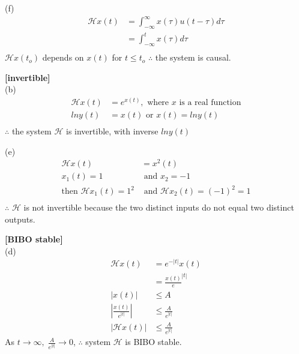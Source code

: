 \documentclass{article}
\begin{document}
(f)
\begin{equation*}
\begin{split}
    \mathcal{H}x(t) &= \int_{-\infty}^{\infty} x(\tau) u (t - \tau) d\tau\\
    &= \int_{-\infty}^{t} x(\tau) d\tau\\
\end{split}
\end{equation*}
$\mathcal{H}x(t_o)$ depends on $x(t)$ for $t \leq t_o$ $\therefore$ the system is causal.


 {\bf [invertible]}\\
(b)
\begin{equation*}
\begin{split}
    \mathcal{H}x(t) &= e^{x(t)}, \text{ where $x$ is a real function}\\
    ln y(t) &= x(t) \text{ or } x(t) = ln y(t)\\
\end{split}
\end{equation*}
$\therefore$ the system $\mathcal{H}$ is invertible, with inverse $lny(t)$

(e)
\begin{equation*}
\begin{split}
    \mathcal{H}x(t) &= x^2(t)\\
    x_1(t) = 1 &\text{ and } x_2 = -1\\
    \text{then } \mathcal{H}x_1(t) = 1^2 &\text{ and } \mathcal{H}x_2(t) = (-1)^2 = 1\\
\end{split}
\end{equation*}
$\therefore$ $\mathcal{H}$ is not invertible because the two distinct inputs do not equal two distinct outputs.


 {\bf [BIBO stable]}\\
(d)
\begin{equation*}
\begin{split}
    \mathcal{H}x(t) &= e^{-|t|}x(t)\\
    &= \frac{x(t)}e^{|t|}\\
    |x(t)| &\leq A\\
    |\frac{x(t)}{e^{|t|}}| &\leq \frac{A}{e^{|t|}}\\
    |\mathcal{H}x(t)| &\leq \frac{A}{e^{|t|}}
\end{split}
\end{equation*}
As $t \rightarrow \infty, \; \frac{A}{e^{|t|}} \rightarrow 0$, $\therefore$ system $\mathcal{H}$ is BIBO stable.
\end{document}
